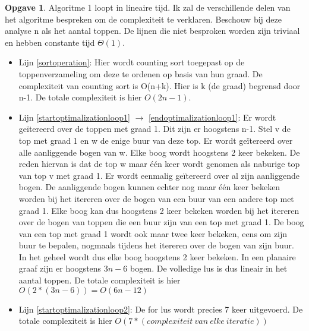 \documentclass[11pt, a4paper, table]{article}
\theoremstyle{definition}
\newtheorem{opgave}{Opgave}
\theoremstyle{definition}
\theoremstyle{definition}
\begin{document}
\begin{opgave}
		Algoritme 1 loopt in lineaire tijd. Ik zal de verschillende delen van het algoritme bespreken om de complexiteit te verklaren. Beschouw bij deze analyse n als het aantal toppen. De lijnen die niet besproken worden zijn triviaal en hebben constante tijd $\Theta(1)$.
		\begin{itemize}
			 \item Lijn \ref{sortoperation}: Hier wordt counting sort toegepast op de toppenverzameling om deze te ordenen op basis van hun graad. De complexiteit van counting sort is O(n+k). Hier is k (de graad) begrensd door n-1. De totale complexiteit is hier $O(2n-1)$.
			 \item Lijn \ref{startoptimalizationloop1} $\rightarrow$ \ref{endoptimalizationloop1}: Er wordt ge\"{i}tereerd over de toppen met graad 1. Dit zijn er hoogstens n-1. Stel v de top met graad 1 en w de enige buur van deze top. 
			 Er wordt ge\"{i}tereerd over alle aanliggende bogen van w. Elke boog wordt hoogstens 2 keer bekeken. De reden hiervan is dat de top w maar \'{e}\'{e}n keer wordt genomen als naburige top van top v met graad 1. Er wordt eenmalig ge\"{i}tereerd over al zijn aanliggende bogen. De aanliggende bogen kunnen echter nog maar \'{e}\'{e}n keer bekeken worden bij het itereren over de bogen van een buur van een andere top met graad 1. 
			 Elke boog kan dus hoogstens 2 keer bekeken worden bij het itereren over de bogen van toppen die een buur zijn van een top met graad 1. De boog van een top met graad 1 wordt ook maar twee keer bekeken, eens om zijn buur te bepalen, nogmaals tijdens het itereren over de bogen van zijn buur. In het geheel wordt dus elke boog hoogstens 2 keer bekeken. 
			 In een planaire graaf zijn er hoogstens $3n-6$ bogen. De volledige lus is dus lineair in het aantal toppen. De totale complexiteit is hier $O(2*(3n-6)) = O(6n-12)$
			\item Lijn \ref{startoptimalizationloop2}: De for lus wordt precies 7 keer uitgevoerd. De totale complexiteit is hier 
			$O(7*(complexiteit\ van\ elke\ iteratie))$

\end{itemize}
\end{opgave}
\end{document}
